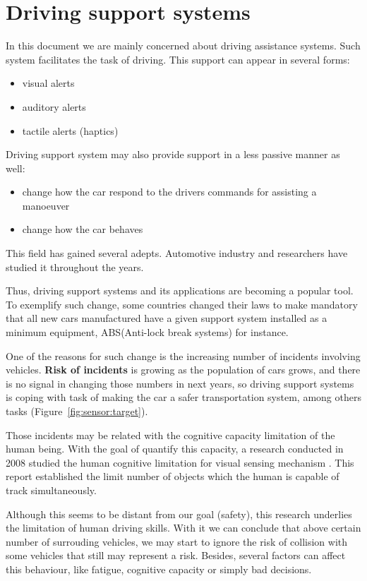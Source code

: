 \section{Driving support systems}

In this document we are mainly concerned about driving assistance systems. Such system facilitates the task of driving. This support can appear in several forms: 

\begin{itemize}
\item visual alerts
\item auditory alerts
\item tactile alerts (haptics\cite{riener2010sensor})
\end{itemize}

Driving support system may also provide support in a less passive manner as well:

\begin{itemize}
\item change how the car respond to the drivers commands for assisting a manoeuver
\item change how the car behaves
\end{itemize}

This field has gained several adepts. Automotive industry and researchers have studied it throughout the years.

Thus, driving support systems and its applications are becoming a popular tool. To exemplify such change, some countries changed their laws to make mandatory that all new cars manufactured have a given support system installed as a minimum equipment, ABS(Anti-lock break systems)  for instance.

One of the reasons for such change is the increasing number of incidents involving vehicles. \textbf{Risk of incidents} is growing as the population of cars grows, and there is no signal in changing those numbers in next years, so driving support systems is coping with task of making the car a safer transportation system, among others tasks (Figure~\ref{fig:sensor:target}).

Those incidents may be related with the cognitive capacity limitation of the human being. With the goal of quantify this capacity, a research conducted in 2008 studied the human cognitive limitation for visual sensing mechanism \cite{LautarutisV}. This report established the limit number of objects which the human is capable of track simultaneously. 

Although this seems to be distant from our goal (safety), this research underlies the limitation of human driving skills. With it we can conclude that above certain number of surrouding vehicles, we may start to ignore the risk of collision with some vehicles that still may represent a risk. Besides, several factors can affect this behaviour, like fatigue, cognitive capacity or simply bad decisions.

